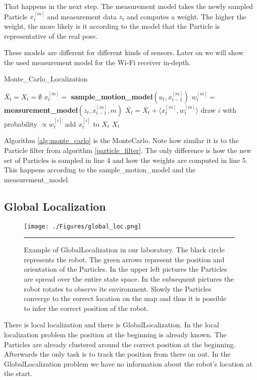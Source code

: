 That happens in the next step. The measurement model takes the newly sampled \gls{Particle} $x_t^{[m]}$ and measurement data $z_t$ and computes a weight. The higher the weight, the more likely is it according to the model that the \gls{Particle} is representative of the real pose. 

These models are different for different kinds of sensors. Later on we will show the used measurement model for the Wi-Fi receiver in-depth. 

\begin{algorithm}
\caption{Monte\_Carlo\_Localization \citep[p.\ 252]{Thrun:2005:PR:1121596}}
\label{alg:monte_carlo}
\begin{algorithmic}[1]
\State $\bar{X_t} = X_t = \emptyset$
\State $x_t^{[m]} = $ \textbf{sample\_motion\_model}$(u_t,x_{t-1}^{[m]})$
\State $w_t^{[m]} = $ \textbf{measurement\_model}$(z_t,x_{t-1}^{[m]},m)$
\State $\bar{X_t} = \bar{X_t} + \langle x_t^{[m]},w_t^{[m]}\rangle$
\EndFor
{}
\State draw $i$ with probability $\propto w_t^{[i]}$
\State add $x_t^{[i]}$ to $X_t$
\EndFor
\State \Return $X_t$
\EndProcedure
\end{algorithmic}
\end{algorithm}

Algorithm \ref{alg:monte_carlo} is the \Gls{MonteCarlo}. Note how similar it is to the \gls{Particle} filter from algorithm \ref{particle_filter}. The only difference is how the new set of \gls{Particle}s is sampled in line 4 and how the weights are computed in line 5. This happens according to the sample\_motion\_model and the measurement\_model. 
\subsection{Global Localization}
\begin{figure}[htbp]
	\centering
		\texttt{[image: ./Figures/global\_loc.png]}
		\rule{35em}{0.5pt}
	\caption[Example of the \gls{GlobalLocalization}]{Example of \gls{GlobalLocalization} in our laboratory. The black circle represents the robot. The green arrows represent the position and orientation of the \gls{Particle}s. In the upper left pictures the \gls{Particle}s are spread over the entire state space. In the subsequent pictures the robot rotates to observe its environment. Slowly the \gls{Particle}s converge to the correct location on the map and thus it is possible to infer the correct position of the robot.}
	\label{fig:global_localization}
\end{figure}
There is local localization and there is \gls{GlobalLocalization}. In the local localization problem the position at the beginning is already known. The \gls{Particle}s are already clustered around the correct position at the beginning. Afterwards the only task is to track the position from there on out. In the \gls{GlobalLocalization} problem we have no information about the robot's location at the start.

